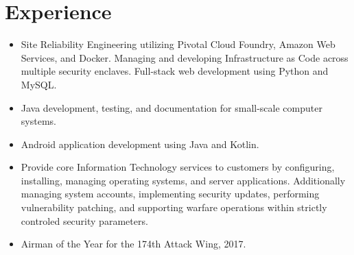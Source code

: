 \documentclass[11pt]{resume}
\author{Seth P. Sevier}
\begin{document}
\maketitle
\smallskip

\section{Experience}
\begin{itemize}
\item Site Reliability Engineering utilizing Pivotal Cloud Foundry, Amazon Web Services, and Docker.  Managing and developing Infrastructure as Code across multiple security enclaves.  Full-stack web development using Python and MySQL.
\item Java development, testing, and documentation for small-scale computer systems.
\item Android application development using Java and Kotlin.
\end{itemize}

\begin{itemize}
\item Provide core Information Technology services to customers by configuring, installing, managing operating systems, and server applications.  Additionally managing system accounts, implementing security updates, performing vulnerability patching, and supporting warfare operations within strictly controled security parameters.
\item Airman of the Year for the 174th Attack Wing, 2017.
\end{itemize}
\end{document}

